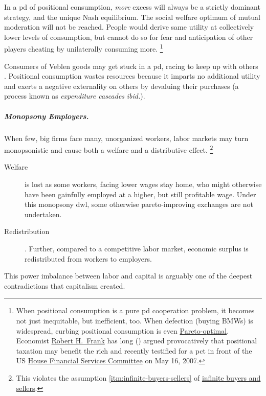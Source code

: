 In a \gls{pd} of positional consumption, \emph{more} excess will always be a strictly dominant strategy, and the unique Nash equilibrium.
The social welfare optimum of mutual moderation will not be reached.
People would derive same utility at collectively lower levels of consumption, but cannot do so for fear and anticipation of other players cheating by unilaterally consuming more.
\footnote{
	When positional consumption is a pure \gls{pd} cooperation problem, it becomes not just inequitable, but inefficient, too.
	When defection (buying BMWs) is widespread, curbing positional consumption is even \hyperref[sec:pareto]{Pareto-optimal}.
	Economist \href{http://www.robert-h-frank.com}{Robert H.~Frank} has long (\citeyear{Frank1987}) argued provocatively that positional taxation may benefit the rich and recently testified for a \gls{pct} in front of the US \href{http://financialservices.house.gov/}{House Financial Services Committee} on May 16, 2007.
}

Consumers of Veblen goods may get stuck in a \gls{pd}, racing to keep up with others \citep{Frank1987}.
Positional consumption wastes resources because it imparts no additional utility and exerts a negative externality on others by devaluing their purchases (a process known as \emph{expenditure cascades} \emph{ibid.}).

\subparagraph[Monopsony Employers]{Monopsony Employers.}
	\label{sec:monopsony-employers}
When few, big firms face many, unorganized workers, labor markets may turn monopsonistic and cause both a welfare and a distributive effect.
\footnote{
	This violates the  assumption \ref{itm:infinite-buyers-sellers} of \hyperref[itm:infinite-buyers-sellers]{infinite buyers and sellers}.
}
\begin{description}
	\item[Welfare] is lost as some workers, facing lower wages stay home, who might otherwise have been gainfully employed at a higher, but still profitable wage.
	Under this monopsony \gls{dwl}, some otherwise pareto-improving exchanges are not undertaken.

	\item[Redistribution].
	Further, compared to a competitive labor market, economic surplus is redistributed from workers to employers.
\end{description}

This power imbalance between labor and capital is arguably one of the deepest contradictions that capitalism created.

